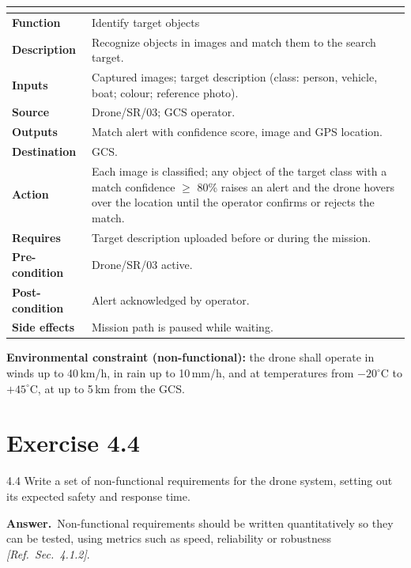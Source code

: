 \documentclass[11pt,a4paper]{article}
\makeatletter
\newcommand{\answer}{\par\noindent\textbf{Answer.}\ }
\newcommand{\refsec}[1]{\hfill\textit{\small[Ref.\ Sec.~#1]}}
\newcommand{\spec}[2]{\noindent\begin{tabularx}{\linewidth}{@{}>{\bfseries}p{3.3cm}X@{}}\toprule
\multicolumn{2}{@{}l}{\textbf{#1}}\\\midrule #2 \bottomrule\end{tabularx}\par\medskip}
\makeatother
\begin{document}
\spec{Drone/SR/04 -- Identify target}{
Function & Identify target objects \\
Description & Recognize objects in images and match them to the search target. \\
Inputs & Captured images; target description (class: person, vehicle, boat; colour; reference photo). \\
Source & Drone/SR/03; GCS operator. \\
Outputs & Match alert with confidence score, image and GPS location. \\
Destination & GCS. \\
Action & Each image is classified; any object of the target class with a match confidence $\ge$ 80\% raises
an alert and the drone hovers over the location until the operator confirms or rejects the match. \\
Requires & Target description uploaded before or during the mission. \\
Pre-condition & Drone/SR/03 active. \\
Post-condition & Alert acknowledged by operator. \\
Side effects & Mission path is paused while waiting. \\
}

\noindent\textbf{Environmental constraint (non-functional):} the drone shall operate in winds up to
40\,km/h, in rain up to 10\,mm/h, and at temperatures from $-20^\circ$C to $+45^\circ$C, at up to 5\,km from the GCS.

\section*{Exercise 4.4}
\begin{question}{4.4}
Write a set of non-functional requirements for the drone system, setting out its expected safety and
response time.
\end{question}
\answer Non-functional requirements should be written quantitatively so they can be tested, using
metrics such as speed, reliability or robustness \refsec{4.1.2}.
\end{document}
